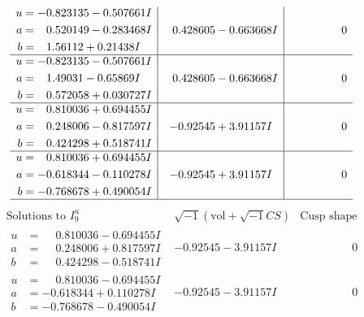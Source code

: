 \documentclass[1p]{elsarticle_modified}
\theoremstyle{definition}
\newcommand{\I}{\sqrt{-1}}
\begin{document}
$$\begin{array}{c|c|c}
\begin{aligned}
u &= -0.823135 - 0.507661 I \\
a &= \phantom{-}0.520149 - 0.283468 I \\
b &= \phantom{-}1.56112 + 0.21438 I\end{aligned}
 & \phantom{-}0.428605 - 0.663668 I & \phantom{-0.000000 } 0 \\ \hline\begin{aligned}
u &= -0.823135 - 0.507661 I \\
a &= \phantom{-}1.49031 - 0.65869 I \\
b &= \phantom{-}0.572058 + 0.030727 I\end{aligned}
 & \phantom{-}0.428605 - 0.663668 I & \phantom{-0.000000 } 0 \\ \hline\begin{aligned}
u &= \phantom{-}0.810036 + 0.694455 I \\
a &= \phantom{-}0.248006 - 0.817597 I \\
b &= \phantom{-}0.424298 + 0.518741 I\end{aligned}
 & -0.92545 + 3.91157 I & \phantom{-0.000000 } 0 \\ \hline\begin{aligned}
u &= \phantom{-}0.810036 + 0.694455 I \\
a &= -0.618344 - 0.110278 I \\
b &= -0.768678 + 0.490054 I\end{aligned}
 & -0.92545 + 3.91157 I & \phantom{-0.000000 } 0\\
 \hline 
 \end{array}$$\newpage$$\begin{array}{c|c|c}  
\text{Solutions to }I^u_{9}& \I (\text{vol} + \sqrt{-1}CS) & \text{Cusp shape}\\
 \hline 
\begin{aligned}
u &= \phantom{-}0.810036 - 0.694455 I \\
a &= \phantom{-}0.248006 + 0.817597 I \\
b &= \phantom{-}0.424298 - 0.518741 I\end{aligned}
 & -0.92545 - 3.91157 I & \phantom{-0.000000 } 0 \\ \hline\begin{aligned}
u &= \phantom{-}0.810036 - 0.694455 I \\
a &= -0.618344 + 0.110278 I \\
b &= -0.768678 - 0.490054 I\end{aligned}
 & -0.92545 - 3.91157 I & \phantom{-0.000000 } 0 \\ \hline\begin{aligned}

\end{aligned}
\end{array}$$
\end{document}
